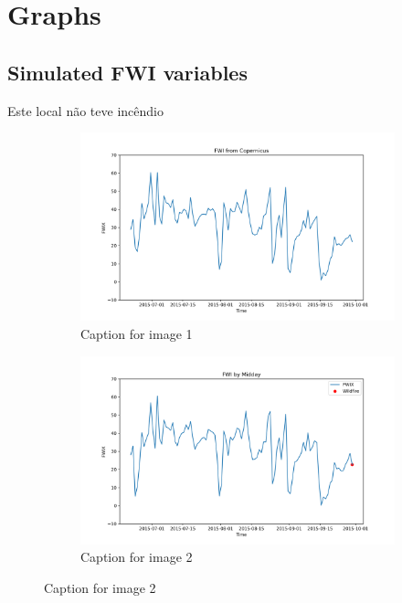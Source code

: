 \chapter{Graphs}
\label{sec:graphs}

\section{Simulated FWI variables}
Este local não teve incêndio
\begin{figure}[h]
\caption{HELLo}
    \centering
    \begin{subfigure}{0.49\textwidth}
        \centering
        \includegraphics[width=\textwidth]{graphs/2015MesmoSitio/2015CopernicusFWI12.png}
        \caption{Caption for image 1}
        \label{fig:img1}
    \end{subfigure}
    \hfill
    \begin{subfigure}{0.49\textwidth}
        \centering
        \includegraphics[width=\textwidth]{graphs/2015MesmoSitio/2015CalcFWI12.png}
        \caption{Caption for image 2}
        \label{fig:img2}
    \end{subfigure}
    \label{fig:both_images}
\end{figure}

